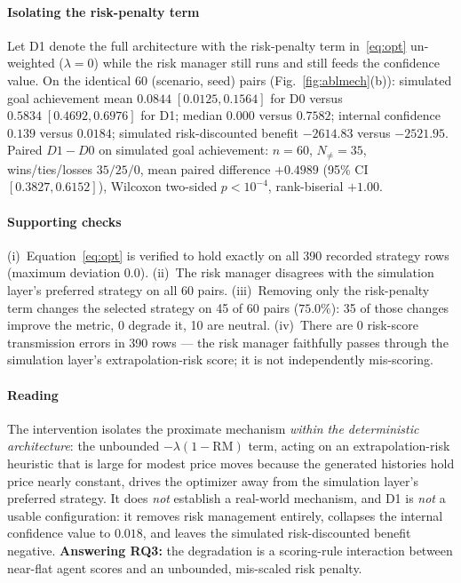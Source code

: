 \documentclass[conference]{IEEEtran}
\newcommand{\Nnz}{N_{\neq}}                 %
\begin{document}
\paragraph{Isolating the risk-penalty term}
Let D1 denote the full architecture with the risk-penalty term in~\eqref{eq:opt}
un-weighted ($\lambda = 0$) while the risk manager still runs and still feeds the
confidence value. On the identical 60 (scenario, seed) pairs
(Fig.~\ref{fig:ablmech}(b)): simulated goal achievement mean
$0.0844\;[0.0125,0.1564]$ for D0 versus $\mathbf{0.5834}\;[0.4692,0.6976]$ for
D1; median $0.000$ versus $0.7582$; internal confidence $0.139$ versus
$\mathbf{0.0184}$; simulated risk-discounted benefit $-2614.83$ versus
$-2521.95$. Paired $D1 - D0$ on simulated goal achievement: $n = 60$,
$\Nnz = 35$, wins/ties/losses $35/25/0$, mean paired difference $\mathbf{+0.4989}$
(95\% CI $[0.3827,0.6152]$), Wilcoxon two-sided $p < 10^{-4}$, rank-biserial
$+1.00$.

\paragraph{Supporting checks}
(i)~Equation~\eqref{eq:opt} is verified to hold exactly on all 390 recorded
strategy rows (maximum deviation $0.0$). (ii)~The risk manager disagrees with
the simulation layer's preferred strategy on all 60 pairs. (iii)~Removing only
the risk-penalty term changes the selected strategy on 45 of 60 pairs
($75.0\%$): 35 of those changes improve the metric, 0 degrade it, 10 are
neutral. (iv)~There are 0 risk-score transmission errors in 390 rows --- the risk
manager faithfully passes through the simulation layer's extrapolation-risk
score; it is not independently mis-scoring.

\paragraph{Reading}
The intervention isolates the proximate mechanism \emph{within the deterministic
architecture}: the unbounded $-\lambda(1 - \mathrm{RM})$ term, acting on an
extrapolation-risk heuristic that is large for modest price moves because the
generated histories hold price nearly constant, drives the optimizer away from
the simulation layer's preferred strategy. It does \emph{not} establish a
real-world mechanism, and D1 is \emph{not} a usable configuration: it removes
risk management entirely, collapses the internal confidence value to $0.018$,
and leaves the simulated risk-discounted benefit negative. \textbf{Answering
RQ3:} the degradation is a scoring-rule interaction between near-flat agent
scores and an unbounded, mis-scaled risk penalty.
\end{document}

